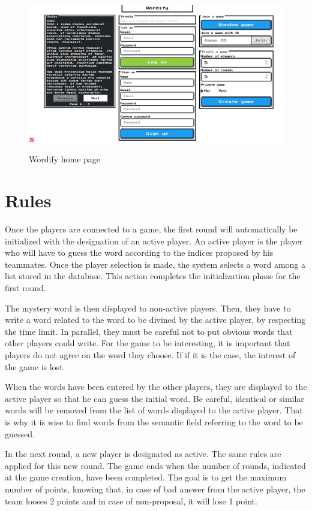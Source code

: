 \documentclass{tnreport}
\begin{document}
\begin{figure}[ht]
	\centering
	\fboxsep=1.2pt
	\includegraphics[scale=0.35]{figures/wordify_home_page}
	\label{fig:wordify_home_page}
	\caption{Wordify home page}
\end{figure} 

\clearpage

\section{Rules}

Once the players are connected to a game, the first round will automatically be initialized with the designation of an active player. An active player is the player who will have to guess the word according to the indices proposed by his teammates. Once the player selection is made, the system selects a word among a list stored in the database. This action completes the initialization phase for the first round. 

The mystery word is then displayed to non-active players. Then, they have to write a word related to the word to be divined by the active player, by respecting the time limit. In parallel, they must be careful not to put obvious words that other players could write. For the game to be interesting, it is important that players do not agree on the word they choose. If if it is the case, the interest of the game is lost. 

When the words have been entered by the other players, they are displayed to the active player so that he can guess the initial word. Be careful, identical or similar words will be removed from the list of words displayed to the active player. That is why it is wise to find words from the semantic field referring to the word to be guessed. 

In the next round, a new player is designated as active. The same rules are applied for this new round. The game ends when the number of rounds, indicated at the game creation, have been completed. The goal is to get the maximum number of points, knowing that, in case of bad answer from the active player, the team looses 2 points and in case of non-proposal, it will lose 1 point. 
\end{document}
